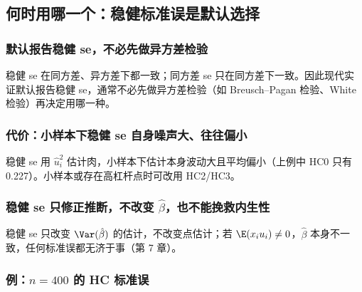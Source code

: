\subsection{何时用哪一个：稳健标准误是默认选择}

\subsubsection{默认报告稳健 se，不必先做异方差检验}

稳健 se 在同方差、异方差下都一致；同方差 se 只在同方差下一致。因此现代实证默认报告稳健 se，通常不必先做异方差检验（如 Breusch--Pagan 检验、White 检验）再决定用哪一种。

\subsubsection{代价：小样本下稳健 se 自身噪声大、往往偏小}

稳健 se 用 $\hat u_i^2$ 估计肉，小样本下估计本身波动大且平均偏小（上例中 HC0 只有 0.227）。小样本或存在高杠杆点时可改用 HC2/HC3。

\subsubsection{稳健 se 只修正推断，不改变 \texorpdfstring{$\hat\beta$}{beta-hat}，也不能挽救内生性}

稳健 se 只改变 $\Var(\hat\beta)$ 的估计，不改变点估计；若 $\E(x_iu_i)\ne0$，$\hat\beta$ 本身不一致，任何标准误都无济于事（第 7 章）。

\subsubsection{例：\texorpdfstring{$n=400$}{n = 400} 的 HC 标准误}

